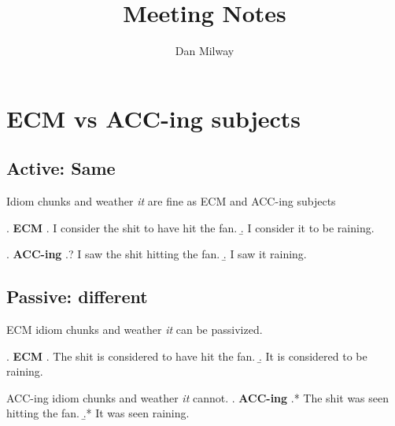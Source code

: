 \documentclass[letterpaper]{article}
\title{Meeting Notes}
\author{Dan Milway}
\begin{document}
\section{ECM vs ACC-ing subjects}
\subsection{Active: Same}
Idiom chunks and weather \textit{it} are fine as ECM and ACC-ing subjects

\ex. \textbf{ECM} 
\a. I consider the shit to have hit the fan.
\b. I consider it to be raining.

\ex. \textbf{ACC-ing}
\a.? I saw the shit hitting the fan.
\b. I saw it raining.

\subsection{Passive: different}
ECM idiom chunks and weather \textit{it} can be passivized.

\ex. \textbf{ECM}
\a. The shit is considered to have hit the fan.
\b. It is considered to be raining.

ACC-ing idiom chunks and weather \textit{it} cannot.
\ex. \textbf{ACC-ing}
\a.* The shit was seen hitting the fan.
\b.* It was seen raining.

\textcite{cinque1996pseudo}
\textcite{cinque1996italian}
\textcite{lasniksaito1999subject}
\printbibliography
\end{document}
